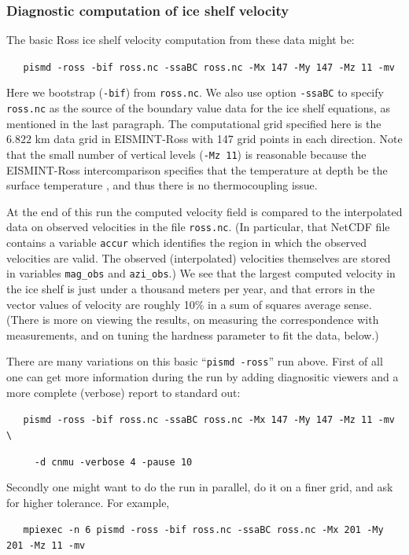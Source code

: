 \documentclass[11pt,final]{amsart}
\begin{document}
\subsubsection*{Diagnostic computation of ice shelf velocity}  The basic Ross ice shelf velocity computation from these data might be:

\verb|   pismd -ross -bif ross.nc -ssaBC ross.nc -Mx 147 -My 147 -Mz 11 -mv|

\noindent Here we bootstrap (\verb|-bif|) from \verb|ross.nc|.  We also use option \verb|-ssaBC| to specify \verb|ross.nc| as the source of the boundary value data for the ice shelf equations, as mentioned in the last paragraph.  The computational grid specified here is the $6.822$ km data grid in EISMINT-Ross with 147 grid points in each direction.  Note that the small number of vertical levels (\verb|-Mz 11|) is reasonable because the EISMINT-Ross intercomparison specifies that the temperature at depth be the surface temperature \cite{MacAyealetal}, and thus there is no thermocoupling issue.

At the end of this run the computed velocity field is compared to the interpolated data on observed velocities in the file \verb|ross.nc|.  (In particular, that NetCDF file contains a variable \verb|accur| which identifies the region in which the observed velocities are valid.  The observed (interpolated) velocities themselves are stored in variables \verb|mag_obs| and \verb|azi_obs|.)  We see that the largest computed velocity in the ice shelf is just under a thousand meters per year, and that errors in the vector values of velocity are roughly 10\% in a sum of squares average sense.  (There is more on viewing the results, on measuring the correspondence with measurements, and on tuning the hardness parameter to fit the data, below.)

There are many variations on this basic ``\verb|pismd -ross|'' run above.  First of all one can get more information during the run by adding diagnositic viewers and a more complete (verbose) report to standard out:

\verb|   pismd -ross -bif ross.nc -ssaBC ross.nc -Mx 147 -My 147 -Mz 11 -mv \|

\verb|     -d cnmu -verbose 4 -pause 10|

\noindent Secondly one might want to do the run in parallel, do it on a finer grid, and ask for higher tolerance.  For example, 

\small
\verb|   mpiexec -n 6 pismd -ross -bif ross.nc -ssaBC ross.nc -Mx 201 -My 201 -Mz 11 -mv|
\normalsize
\end{document}

